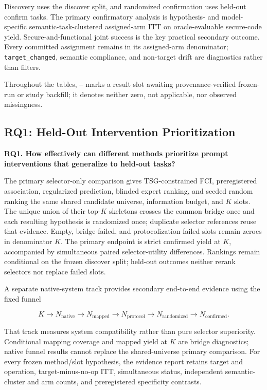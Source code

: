 \documentclass[acmsmall,screen,review,anonymous]{acmart}
\begin{document}
Discovery uses the discover split, and randomized confirmation uses held-out
confirm tasks. The primary confirmatory analysis is hypothesis- and
model-specific semantic-task-clustered assigned-arm ITT on oracle-evaluable
secure-code yield. Secure-and-functional joint success is the key practical
secondary outcome. Every
committed assignment remains in its assigned-arm denominator;
\texttt{target\_changed}, semantic compliance, and non-target drift are
diagnostics rather than filters.

Throughout the tables, \texttt{--} marks a result slot awaiting
provenance-verified frozen-run or study backfill; it denotes neither zero, not
applicable, nor observed missingness.

\subsection{RQ1: Held-Out Intervention Prioritization}

\textbf{RQ1. How effectively can different methods prioritize prompt
interventions that generalize to held-out tasks?}

The primary selector-only comparison gives TSG-constrained FCI,
preregistered association, regularized prediction, blinded expert ranking, and
seeded random ranking the same shared candidate universe, information budget,
and $K$ slots. The unique union of their top-$K$ skeletons crosses the common
bridge once and each resulting hypothesis is randomized once; duplicate
selector references reuse that evidence. Empty, bridge-failed, and
protocolization-failed slots remain zeroes in denominator $K$. The primary
endpoint is strict confirmed yield at $K$, accompanied by simultaneous paired
selector-utility differences. Rankings remain conditional on the frozen
discover split; held-out outcomes neither rerank selectors nor replace failed
slots.

A separate native-system track provides secondary end-to-end evidence using
the fixed funnel

\[
K \rightarrow N_{\mathrm{native}} \rightarrow N_{\mathrm{mapped}}
\rightarrow N_{\mathrm{protocol}} \rightarrow N_{\mathrm{randomized}}
\rightarrow N_{\mathrm{confirmed}}.
\]

That track measures system compatibility rather than pure selector
superiority. Conditional mapping coverage and mapped yield at $K$ are bridge
diagnostics; native funnel results cannot replace the shared-universe primary
comparison. For every frozen method/slot hypothesis, the evidence report
retains target and operation, target-minus-no-op ITT, simultaneous status,
independent semantic-cluster and arm counts, and preregistered specificity
contrasts.
\end{document}
